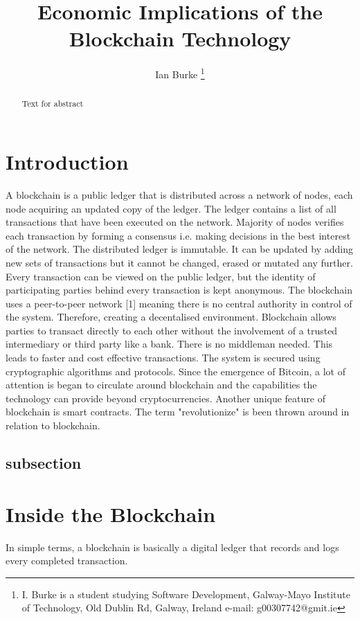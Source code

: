 \documentclass[report]{IEEEtran}
\begin{document}
\title{Economic Implications of the Blockchain Technology}
\author{Ian Burke %
\thanks{I. Burke is a student studying
Software Development, Galway-Mayo Institute of Technology, Old Dublin Rd, Galway, Ireland e-mail: g00307742@gmit.ie}%
}

\maketitle

\begin{abstract}
Text for abstract
\end{abstract}


\section{Introduction}
A blockchain is a public ledger that is distributed across a network of nodes, each node acquiring an updated copy of the ledger. The ledger contains a list of all transactions that have been executed on the network. Majority of nodes verifies each transaction by forming a consensus i.e. making decisions in the best interest of the network. The distributed ledger is immutable. It can be updated by adding new sets of transactions but it cannot be changed, erased or mutated any further. Every transaction can be viewed on the public ledger, but the identity of participating parties behind every transaction is kept anonymous. The blockchain uses a peer-to-peer network [1] meaning there is no central authority in control of the system. Therefore, creating a decentalised environment. Blockchain allows parties to transact directly to each other without the involvement of a trusted intermediary or third party like a bank. There is no middleman needed. This leads to faster and cost effective transactions. The system is secured using cryptographic algorithms and protocols. Since the emergence of Bitcoin, a lot of attention is began to circulate around blockchain and the capabilities the technology can provide beyond cryptocurrencies. Another unique feature of blockchain is smart contracts.  The term "revolutionize" is been thrown around in relation to blockchain. 

\subsection{subsection}

\section{Inside the Blockchain}
In simple terms, a blockchain is basically a digital ledger that records and logs every completed transaction. 
\end{document}

